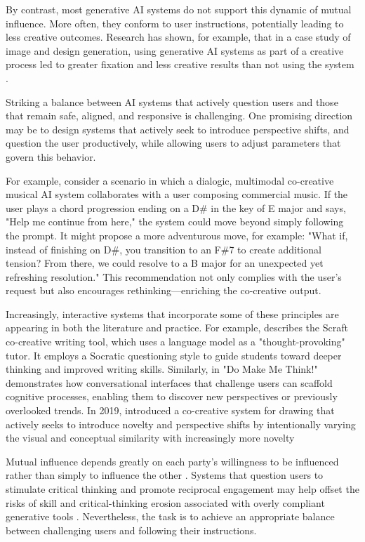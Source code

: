 By contrast, most generative AI systems do not support this dynamic of mutual influence. More often, they conform to user instructions, potentially leading to less creative outcomes. Research has shown, for example, that in a case study of image and design generation, using generative AI systems as part of a creative process led to greater fixation and less creative results than not using the system \cite{Wadinambiarachchi2024-jn}. 

Striking a balance between AI systems that actively question users and those that remain safe, aligned, and responsive is challenging. One promising direction may be to design systems that actively seek to introduce perspective shifts, and question the user productively, while allowing users to adjust parameters that govern this behavior. 

For example, consider a scenario in which a dialogic, multimodal co-creative musical AI system collaborates with a user composing commercial music. If the user plays a chord progression ending on a D\# in the key of E major and says, "Help me continue from here," the system could move beyond simply following the prompt. It might propose a more adventurous move, for example: "What if, instead of finishing on D\#, you transition to an F\#7 to create additional tension? From there, we could resolve to a B major for an unexpected yet refreshing resolution." This recommendation not only complies with the user's request but also encourages rethinking—enriching the co-creative output.

Increasingly, interactive systems that incorporate some of these principles are appearing in both the literature and practice. For example, \cite{Kim2023-wt} describes the Scraft co-creative writing tool, which uses a language model as a "thought-provoking" tutor. It employs a Socratic questioning style to guide students toward deeper thinking and improved writing skills. Similarly, in "Do Make Me Think!" \cite{Reicherts2020-up} demonstrates how conversational interfaces that challenge users can scaffold cognitive processes, enabling them to discover new perspectives or previously overlooked trends. In 2019, \cite{Karimi2019-io} introduced a co-creative system for drawing that actively seeks to introduce novelty and perspective shifts by intentionally varying the visual and conceptual similarity with increasingly more novelty 

Mutual influence depends greatly on each party's willingness to be influenced rather than simply to influence the other \cite{Bohm1996-fo}. Systems that question users to stimulate critical thinking and promote reciprocal engagement may help offset the risks of skill and critical-thinking erosion associated with overly compliant generative tools \cite{Abbas2024-sf, Essel2024-qc}. Nevertheless, the task is to achieve an appropriate balance between challenging users and following their instructions.

